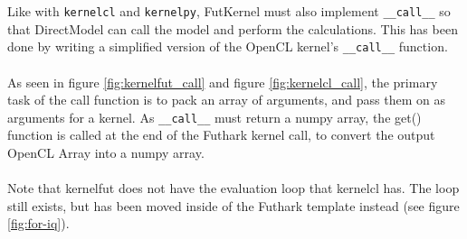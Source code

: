 \documentclass[11pt]{article}
\newcommand{\call}{\texttt{\_\_call\_\_}}
\begin{document}
Like with \texttt{kernelcl} and \texttt{kernelpy}, FutKernel must also implement
\call{} so that DirectModel can call the model and perform the
calculations.
This has been done by writing a simplified version of the OpenCL kernel's 
\call{} function. 
\\\\
As seen in figure \ref{fig:kernelfut_call} and figure \ref{fig:kernelcl_call},
the primary task of the call function is to pack an array of arguments, and
pass them on as arguments for a kernel.
As \call{} must return a numpy array, the get() function is called at the end
of the Futhark kernel call, to convert the output OpenCL Array into a 
numpy array.
\\\\
Note that kernelfut does not have the evaluation loop that kernelcl has.
The loop still exists, but has been moved inside of the Futhark template 
instead (see figure \ref{fig:for-iq}).
\end{document}

